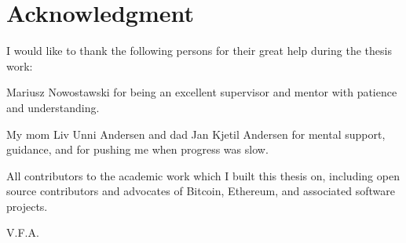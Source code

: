 \chapter*{Acknowledgment}

I would like to thank the following persons for their great help during the thesis work:

\noindent
Mariusz Nowostawski for being an excellent supervisor and mentor with patience and understanding.

\noindent
My mom Liv Unni Andersen and dad Jan Kjetil Andersen for mental support, guidance, and for pushing me when progress was slow.

\noindent
All contributors to the academic work which I built this thesis on, including open source contributors and advocates of Bitcoin, Ethereum, and associated software projects.





\begin{flushright}
V.F.A.\\[1pc]
\end{flushright}